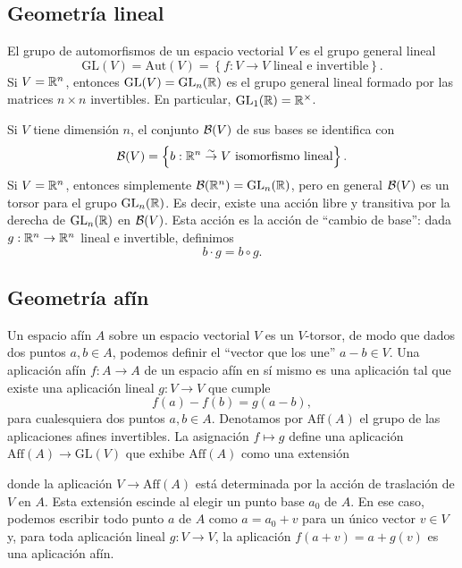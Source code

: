\documentclass[11pt,a4paper]{amsbook}
\theoremstyle{remark} \newtheorem{rmk}[subsection]{Observación}
\theoremstyle{definition} \newtheorem{defn}[subsection]{Definición}
\theoremstyle{definition} \newtheorem{ex}[subsection]{Ejemplo}
\theoremstyle{definition} \newtheorem{ej}[subsection]{Ejercicio}
\begin{document}
\subsection{Geometría lineal} El grupo de automorfismos de un espacio vectorial $V$ es el grupo general lineal \[\mathrm{GL}(V)=\mathrm{Aut}(V) = \left\{ f:V\rightarrow V \text{ lineal e invertible} \right\}.\]
Si $V=\mathbb R^n$, entonces $\mathrm{GL}(V)=\mathrm{GL}_n(\mathbb R)$ es el grupo general lineal formado por las matrices $n\times n$ invertibles. En particular, $\mathrm{GL}_1(\mathbb R)=\mathbb R^\times$.

Si $V$ tiene dimensión $n$, el conjunto $\mathcal B(V)$ de sus bases se identifica con
\begin{equation*}
\mathcal B(V) = \left\{b: \mathbb R^n \overset{\sim}{\rightarrow} V \text{ isomorfismo lineal}\right\}.
\end{equation*}
Si $V=\mathbb R^n$, entonces simplemente $\mathcal B(\mathbb R^n)=\operatorname{GL}_n(\mathbb R)$, pero en general $\mathcal B(V)$ es un torsor para el grupo $\operatorname{GL}_n(\mathbb R)$. Es decir, existe una acción libre y transitiva por la derecha de $\operatorname{GL}_n(\mathbb R)$ en $\mathcal B(V)$. Esta acción es la acción de ``cambio de base'': dada $g:\mathbb R^n\rightarrow \mathbb R^n$ lineal e invertible, definimos
\begin{equation*}
b\cdot g = b\circ g.
\end{equation*}

\subsection{Geometría afín} Un espacio afín $A$ sobre un espacio vectorial $V$ es un $V$-torsor, de modo que dados dos puntos $a,b \in A$, podemos definir el ``vector que los une'' $a-b \in V$. Una aplicación afín $f:A\rightarrow A$ de un espacio afín en sí mismo es una aplicación tal que existe una aplicación lineal $g:V\rightarrow V$ que cumple
\begin{equation*}
f(a)-f(b) = g(a-b),
\end{equation*}
para cualesquiera dos puntos $a,b\in A$. Denotamos por $\mathrm{Aff}(A)$ el grupo de las aplicaciones afines invertibles. La asignación $f\mapsto g$ define una aplicación $\mathrm{Aff}(A)\rightarrow \mathrm{GL}(V)$ que exhibe $\mathrm{Aff}(A)$ como una extensión
\begin{center}
\end{center}
donde la aplicación $V\rightarrow \mathrm{Aff}(A)$ está determinada por la acción de traslación de $V$ en $A$. Esta extensión escinde al elegir un punto base $a_0$ de $A$. En ese caso, podemos escribir todo punto $a$ de $A$ como $a=a_0+v$ para un único vector $v\in V$ y, para toda aplicación lineal $g:V\rightarrow V$, la aplicación $f(a+v)=a+g(v)$ es una aplicación afín.
\end{document}
